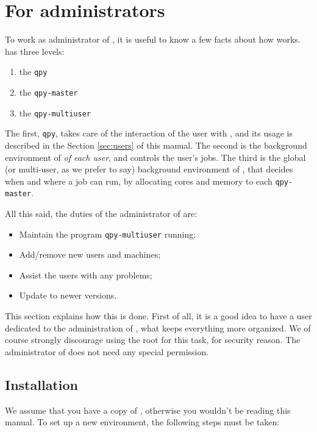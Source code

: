 \documentclass[a4paper,12pt]{article}
\begin{document}
\newpage
\section{For administrators}

To work as administrator of \qpy{}, it is useful to know a few facts about how \qpy{} works.
\qpy{} has three levels:
\begin{enumerate}
\item the \texttt{qpy}
\item the \texttt{qpy-master}
\item the \texttt{qpy-multiuser}
\end{enumerate}
The first, \texttt{qpy}, takes care of the interaction of the user with \qpy{}, and its usage is described in the Section \ref{sec:users} of this manual.
The second is the background environment of \qpy{} \emph{of each user}, and controls the user's jobs.
The third is the global (or multi-user, as we prefer to say) background environment of \qpy{}, that decides when and where a job can run, by allocating cores and memory to each \texttt{qpy-master}.

All this said, the duties of the administrator of \qpy{} are:
\begin{itemize}
\item Maintain the program \texttt{qpy-multiuser} running;
\item Add/remove new users and machines;
\item Assist the users with any problems;
\item Update \qpy{} to newer versions.
\end{itemize}
This section explains how this is done.
First of all, it is a good idea to have a user dedicated to the administration of \qpy{}, what keeps everything more organized.
We of course strongly discourage using the root for this task, for security reason.
The administrator of \qpy{} does not need any special permission.

\subsection{Installation}\label{sec:instal_admin}

We assume that you have a copy of \qpy{}, otherwise you wouldn't be reading this manual.
To set up a new \qpy{} environment, the following steps must be taken:
\end{document}
